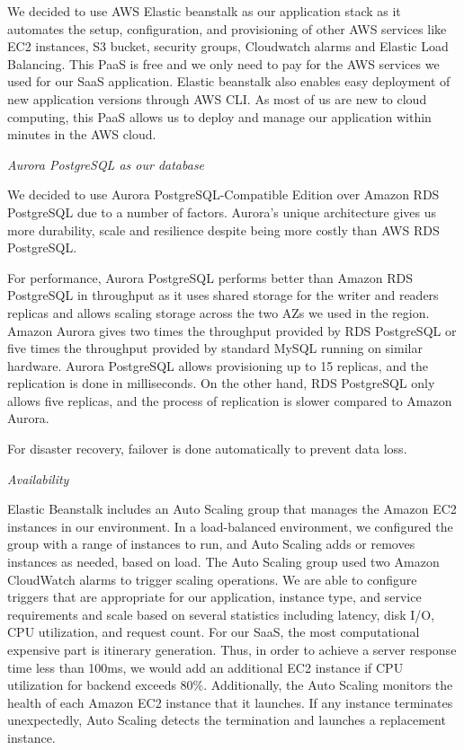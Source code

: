\documentclass[a4paper]{article}
\begin{document}
            We decided to use AWS Elastic beanstalk as our application stack as it automates the setup, configuration, and provisioning of other AWS services like EC2 instances, S3 bucket, security groups, Cloudwatch alarms and Elastic Load Balancing. This PaaS is free and we only need to pay for the AWS services we used for our SaaS application. Elastic beanstalk also enables easy deployment of new application versions through AWS CLI. As most of us are new to cloud computing, this PaaS allows us to deploy and manage our application within minutes in the AWS cloud.
            
            \textit{Aurora PostgreSQL as our database}
            
            We decided to use Aurora PostgreSQL-Compatible Edition over Amazon RDS PostgreSQL due to a number of factors. Aurora's unique architecture gives us more durability, scale and resilience despite being more costly than AWS RDS PostgreSQL.

            For performance, Aurora PostgreSQL performs better than Amazon RDS PostgreSQL in throughput as it uses shared storage for the writer and readers replicas and allows scaling storage across the two AZs we used in the region. Amazon Aurora gives two times the throughput provided by RDS PostgreSQL or five times the throughput provided by standard MySQL running on similar hardware. Aurora PostgreSQL allows provisioning up to 15 replicas, and the replication is done in milliseconds. On the other hand, RDS PostgreSQL only allows five replicas, and the process of replication is slower compared to Amazon Aurora.
            
            For disaster recovery,  failover is done automatically to prevent data loss.
            
            \textit{Availability}
            
            Elastic Beanstalk includes an Auto Scaling group that manages the Amazon EC2 instances in our environment. In a load-balanced environment, we configured the group with a range of instances to run, and Auto Scaling adds or removes instances as needed, based on load. The Auto Scaling group used two Amazon CloudWatch alarms to trigger scaling operations. We are able to configure triggers that are appropriate for our application, instance type, and service requirements and scale based on several statistics including latency, disk I/O, CPU utilization, and request count. For our SaaS, the most computational expensive part is itinerary generation. Thus, in order to achieve a server response time less than 100ms, we would add an additional EC2 instance if CPU utilization for backend exceeds 80\%. Additionally, the Auto Scaling monitors the health of each Amazon EC2 instance that it launches. If any instance terminates unexpectedly, Auto Scaling detects the termination and launches a replacement instance.
\end{document}
